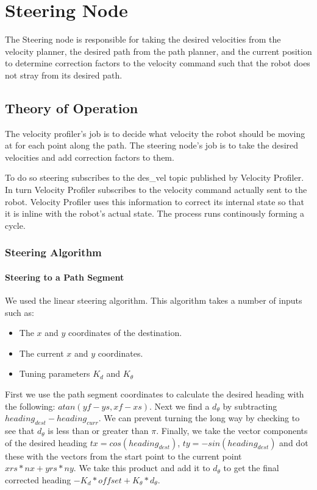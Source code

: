 \section{Steering Node}

The Steering node is responsible for taking the desired velocities from
the velocity planner, the desired path from the path planner, and the
current position to determine correction factors to the velocity command
such that the robot does not stray from its desired path.

\subsection{Theory of Operation}

The velocity profiler's job is to decide what velocity the robot
should be moving at for each point along the path.  The steering
node's job is to take the desired velocities and add correction
factors to them.

To do so steering subscribes to the des\_vel topic published by
Velocity Profiler.  In turn Velocity Profiler subscribes to the
velocity command actually sent to the robot. Velocity Profiler uses
this information to correct its internal state so that it is inline
with the robot's actual state.  The process runs continously forming a
cycle.

\subsubsection{Steering Algorithm}

\paragraph{Steering to a Path Segment}

We used the linear steering algorithm. This algorithm takes a number
of inputs such as:

\begin{itemize}
\item
  The $x$ and $y$ coordinates of the destination.
\item
  The current $x$ and $y$ coordinates.
\item
  Tuning parameters $K_d$ and $K_\theta$
\end{itemize}
First we use the path segment coordinates to calculate the desired
heading with the following: $atan(yf-ys,xf-xs)$. Next we find a
$d_\theta$ by subtracting $heading_{dest}-heading_{curr}$. We can
prevent turning the long way by checking to see that $d_\theta$ is less
than or greater than $\pi$. Finally, we take the vector components of
the desired heading $tx=cos(heading_{dest})$, $ty=-sin(heading_{dest})$
and dot these with the vectors from the start point to the current point
$xrs*nx+yrs*ny$. We take this product and add it to $d_\theta$ to get
the final corrected heading $-K_d*offset+K_{\theta}*d_\theta$.

